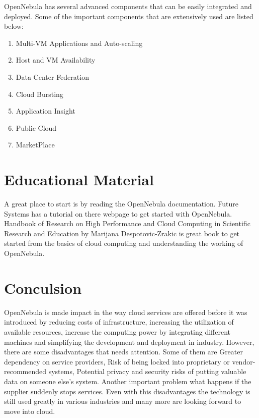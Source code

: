 \documentclass[9pt,twocolumn,twoside]{styles/osajnl}
\begin{document}
OpenNebula has several {advanced components}\cite{www-components} 
that can be easily 
integrated and deployed. Some of the important components that are 
extensively used are listed below:

\begin{enumerate}
	
	\item Multi-VM Applications and Auto-scaling
	\item Host and VM Availability
	\item Data Center Federation
	\item Cloud Bursting
	\item Application Insight
	\item Public Cloud
	\item MarketPlace
	
\end{enumerate}

\section{Educational Material}

A great place to start is by reading the {OpenNebula 
documentation}\cite{www-opennebula-documentation}. 
{Future Systems has a tutorial on there 
webpage}\cite{www-opennebula-tutorial} to get started with 
OpenNebula. {Handbook of Research on High Performance and Cloud 
Computing in Scientific Research and Education}\cite{book-hpc} by 
Marijana Despotovic-Zrakic is great book to get started from the 
basics of cloud computing and understanding the working of OpenNebula.

\section{Conculsion}

OpenNebula is made impact in the way cloud services are offered 
before it was introduced by reducing costs of infrastructure, 
increasing the utilization of available resources, increase the 
computing power by integrating different machines and simplifying the 
development and deployment in industry. However, there are some 
disadvantages that needs attention. Some of them are Greater 
dependency on service providers, Risk of being locked into 
proprietary or vendor-recommended systems, Potential privacy and 
security risks of putting valuable data on someone else's system. 
Another important problem what happens if the supplier suddenly stops 
services. Even with this disadvantages the technology is still used 
greatly in various industries and many more are looking forward to 
move into cloud.


\end{document}
